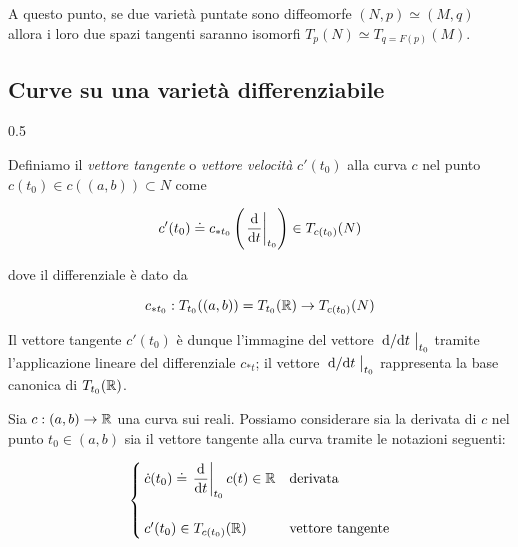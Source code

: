 A questo punto, se due varietà puntate sono diffeomorfe $ (N,p) \simeq (M,q) $ allora i loro due spazi tangenti saranno isomorfi $ T_{p}(N) \simeq T_{q=F(p)}(M) $.

\subsection{Curve su una varietà differenziabile}

	{0.5}{%
			}

Definiamo il \textit{vettore tangente} o \textit{vettore velocità} $ c'(t_{0}) $ alla curva $ c $ nel punto $ c(t_{0}) \in c((a,b)) \subset N $ come

\begin{equation}
	c'(t_{0}) \doteq c_{*t_{0}} \left( \eval{ \dv{t} }_{t_{0}} \right) \in T_{c(t_{0})}(N)
\end{equation}

dove il differenziale è dato da

\begin{equation}
	c_{*t_{0}} : T_{t_{0}}((a,b)) = T_{t_{0}}(\mathbb{R}) \to T_{c(t_{0})}(N)
\end{equation}

Il vettore tangente $ c'(t_{0}) $ è dunque l'immagine del vettore $ \eval{ \dv*{t} }_{t_{0}} $ tramite l'applicazione lineare del differenziale $ c_{*t} $; il vettore $ \eval{ \dv*{t} }_{t_{0}} $ rappresenta la base canonica di $ T_{t_{0}}(\mathbb{R}) $.

\begin{remark}
	Sia $ c : (a,b) \to \mathbb{R} $ una curva sui reali. Possiamo considerare sia la derivata di $ c $ nel punto $ t_{0} \in (a,b) $ sia il vettore tangente alla curva tramite le notazioni seguenti:
	
	\begin{equation}
		\begin{cases}
			\dot{c}(t_{0}) \doteq \eval{ \ddv{t} }_{t_{0}} c(t) \in \R & \text{derivata}\\\\
			c'(t_{0}) \in T_{c(t_{0})}(\R) & \text{vettore tangente}
		\end{cases}
	\end{equation}
\end{remark}

